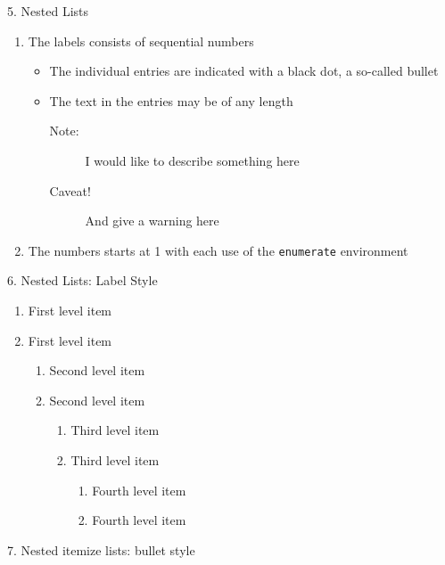 \documentclass{article}
\begin{document}
	\vspace{10pt}
	
	5. Nested Lists
	
	\begin{enumerate}
		\item The labels consists of sequential numbers
		\begin{itemize}
			\item The individual entries are indicated with a black dot, a so-called bullet
			\item The text in the entries may be of any length
			\begin{description}
				\item[Note:] I would like to describe something here
				\item[Caveat!] And give a warning here
			\end{description}
		\end{itemize}
		\item The numbers starts at 1 with each use of the \texttt{enumerate} environment
	\end{enumerate}
	
	6. Nested Lists: Label Style
	
	\begin{enumerate}
		\item First level item
		\item First level item
		\begin{enumerate}
			\item Second level item
			\item Second level item
			\begin{enumerate}
				\item Third level item
				\item Third level item
				\begin{enumerate}
					\item Fourth level item
					\item Fourth level item
				\end{enumerate}
			\end{enumerate}
		\end{enumerate}
	\end{enumerate}
	
	7. Nested itemize lists: bullet style
	
\end{document}
